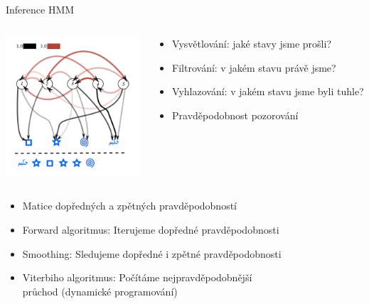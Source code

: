 \documentclass{beamer}
\begin{document}
\subsection{}
\begin{frame}{Inference HMM}
\begin{columns}
\begin{column}{5cm}
\includegraphics[width=5cm]{HMMsequence.pdf}
\end{column}
\begin{column}{8cm}
\begin{itemize}
\item Vysvětlování: jaké stavy jsme prošli?
\item Filtrování: v jakém stavu právě jsme?
\item Vyhlazování: v jakém stavu jsme byli tuhle?
\item Pravděpodobnost pozorování
\end{itemize}
\end{column}
\end{columns}

\begin{itemize}
\item Matice dopředných a zpětných pravděpodobností
\item Forward algoritmus: Iterujeme dopředné pravděpodobnosti
\item Smoothing: Sledujeme dopředné i zpětné pravděpodobnosti
\item Viterbiho algoritmus: Počítáme nejpravděpodobnější \\ průchod (dynamické programování)
\end{itemize}
\end{frame}
\end{document}

